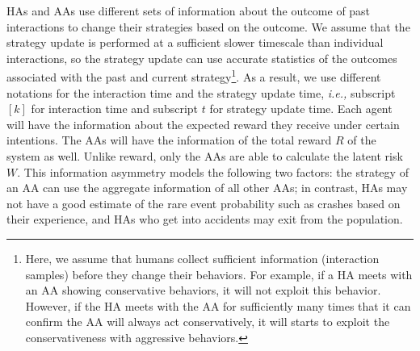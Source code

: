 \documentclass[letterpaper]{article} %
\newcommand{\ie}{\textit{i.e., }}
\begin{document}
HAs and AAs use different sets of information about the outcome of past interactions to change their strategies based on the outcome. We assume that the strategy update is performed at a sufficient slower timescale than individual interactions, so the strategy update can use accurate statistics of the outcomes associated with the past and current strategy\footnote{Here, we assume that humans collect sufficient information (interaction samples) before they change their behaviors. For example, if a HA meets with an AA showing conservative behaviors, it will not exploit this behavior. However, if the HA meets with the AA for sufficiently many times that it can confirm the AA will always act conservatively, it will starts to exploit the conservativeness with aggressive behaviors.}. As a result, we use different notations for the interaction time and the strategy update time, \ie subscript $[k]$ for interaction time and subscript $t$ for strategy update time. Each agent will have the information about the expected reward they receive under certain intentions. The AAs will have the information of the total reward $R$ of the system as well. Unlike reward, only the AAs are able to calculate the latent risk $W$. This information asymmetry models the following two factors: the strategy of an AA can use the aggregate information of all other AAs; in contrast, HAs may not have a good estimate of the rare event probability such as crashes based on their experience, and HAs who get into accidents may exit from the population. 
\end{document}
